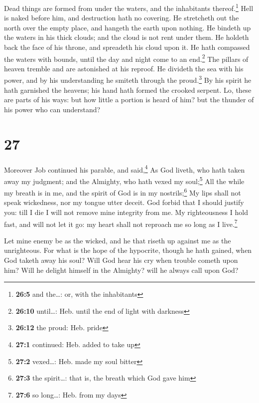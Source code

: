  Dead things are formed from under the waters, and the
inhabitants thereof.\footnote{\textbf{26:5} and the\ldots: or, with the
  inhabitants}  Hell is naked before him, and destruction
hath no covering.  He stretcheth out the north over the
empty place, and hangeth the earth upon nothing.  He
bindeth up the waters in his thick clouds; and the cloud is not rent
under them.  He holdeth back the face of his throne, and
spreadeth his cloud upon it.  He hath compassed the
waters with bounds, until the day and night come to an end.\footnote{\textbf{26:10}
  until\ldots: Heb. until the end of light with darkness}
 The pillars of heaven tremble and are astonished at his
reproof.  He divideth the sea with his power, and by his
understanding he smiteth through the proud.\footnote{\textbf{26:12} the
  proud: Heb. pride}  By his spirit he hath garnished the
heavens; his hand hath formed the crooked serpent.  Lo,
these are parts of his ways: but how little a portion is heard of him?
but the thunder of his power who can understand?

\hypertarget{section-26}{%
\section{27}\label{section-26}}

 Moreover Job continued his parable, and said,\footnote{\textbf{27:1}
  continued: Heb. added to take up}  As God liveth, who
hath taken away my judgment; and the Almighty, who hath vexed my
soul;\footnote{\textbf{27:2} vexed\ldots: Heb. made my soul bitter}
 All the while my breath is in me, and the spirit of God
is in my nostrils;\footnote{\textbf{27:3} the spirit\ldots: that is, the
  breath which God gave him}  My lips shall not speak
wickedness, nor my tongue utter deceit.  God forbid that I
should justify you: till I die I will not remove mine integrity from me.
 My righteousness I hold fast, and will not let it go: my
heart shall not reproach me so long as I live.\footnote{\textbf{27:6} so
  long\ldots: Heb. from my days}

 Let mine enemy be as the wicked, and he that riseth up
against me as the unrighteous.  For what is the hope of
the hypocrite, though he hath gained, when God taketh away his soul?
 Will God hear his cry when trouble cometh upon him?
 Will he delight himself in the Almighty? will he always
call upon God?

